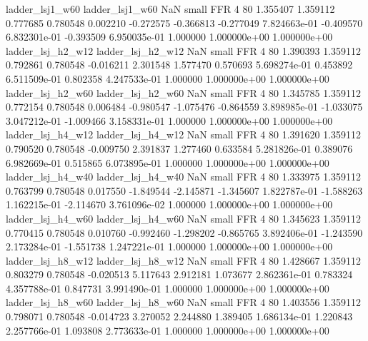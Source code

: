          ladder_lsj1_w60          ladder_lsj1_w60                   NaN      small      FFR                 4 80 1.355407       1.359112 0.777685       0.780548    0.002210     -0.272575     -0.366813    -0.277049   7.824663e-01 -0.409570 6.832301e-01    -0.393509   6.950035e-01            1.000000    1.000000e+00        1.000000e+00
       ladder_lsj_h2_w12        ladder_lsj_h2_w12                   NaN      small      FFR                 4 80 1.390393       1.359112 0.792861       0.780548   -0.016211      2.301548      1.577470     0.570693   5.698274e-01  0.453892 6.511509e-01     0.802358   4.247533e-01            1.000000    1.000000e+00        1.000000e+00
       ladder_lsj_h2_w60        ladder_lsj_h2_w60                   NaN      small      FFR                 4 80 1.345785       1.359112 0.772154       0.780548    0.006484     -0.980547     -1.075476    -0.864559   3.898985e-01 -1.033075 3.047212e-01    -1.009466   3.158331e-01            1.000000    1.000000e+00        1.000000e+00
       ladder_lsj_h4_w12        ladder_lsj_h4_w12                   NaN      small      FFR                 4 80 1.391620       1.359112 0.790520       0.780548   -0.009750      2.391837      1.277460     0.633584   5.281826e-01  0.389076 6.982669e-01     0.515865   6.073895e-01            1.000000    1.000000e+00        1.000000e+00
       ladder_lsj_h4_w40        ladder_lsj_h4_w40                   NaN      small      FFR                 4 80 1.333975       1.359112 0.763799       0.780548    0.017550     -1.849544     -2.145871    -1.345607   1.822787e-01 -1.588263 1.162215e-01    -2.114670   3.761096e-02            1.000000    1.000000e+00        1.000000e+00
       ladder_lsj_h4_w60        ladder_lsj_h4_w60                   NaN      small      FFR                 4 80 1.345623       1.359112 0.770415       0.780548    0.010760     -0.992460     -1.298202    -0.865765   3.892406e-01 -1.243590 2.173284e-01    -1.551738   1.247221e-01            1.000000    1.000000e+00        1.000000e+00
       ladder_lsj_h8_w12        ladder_lsj_h8_w12                   NaN      small      FFR                 4 80 1.428667       1.359112 0.803279       0.780548   -0.020513      5.117643      2.912181     1.073677   2.862361e-01  0.783324 4.357788e-01     0.847731   3.991490e-01            1.000000    1.000000e+00        1.000000e+00
       ladder_lsj_h8_w60        ladder_lsj_h8_w60                   NaN      small      FFR                 4 80 1.403556       1.359112 0.798071       0.780548   -0.014723      3.270052      2.244880     1.389405   1.686134e-01  1.220843 2.257766e-01     1.093808   2.773633e-01            1.000000    1.000000e+00        1.000000e+00
